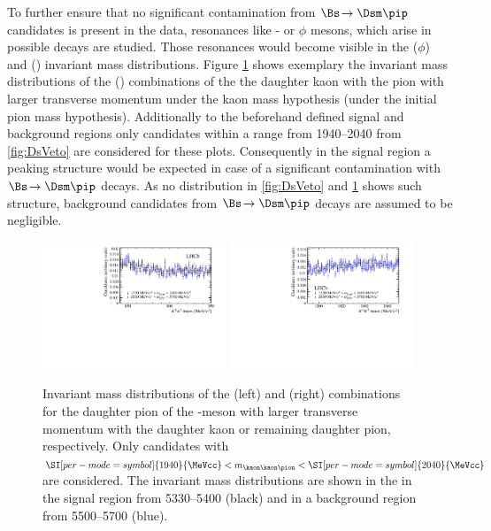 To further ensure that no significant contamination from $\Bs\!\to\Dsm\pip$ candidates is present in the data, resonances like \Kstarz- or $\phi$ mesons, which arise in possible \Dsm decays are studied.
Those resonances would become visible in the \kaon\kaon ($\phi$) and \kaon\pion (\Kstarz) invariant mass distributions.
Figure \ref{fig:phi_Kst_veto} shows exemplary the invariant mass distributions of the \kaon\kaon (\kaon\pion) combinations of the the daughter kaon with the
pion with larger transverse momentum under the kaon mass hypothesis (under the initial pion mass hypothesis).
Additionally to the beforehand defined signal and background regions only candidates within a range from \SIrange[per-mode=symbol]{1940}{2040}{\MeVcc} from \cref{fig:DsVeto} are considered for these plots.
Consequently in the signal region a peaking structure would be expected in case of a significant contamination with $\Bs\!\to\Dsm\pip$ decays.
As no distribution in \cref{fig:DsVeto} and \cref{fig:phi_Kst_veto} shows such structure, background candidates from $\Bs\!\to\Dsm\pip$ decays are assumed to be negligible.
\begin{figure}[tbp]
    \centering
    \includegraphics[width=0.49\textwidth]{06selection/figs/KstarHypo2.pdf}
    \includegraphics[width=0.49\textwidth]{06selection/figs/PhiHypo2.pdf}
    \caption{Invariant mass distributions of the \kaon\pion (left) and \kaon\kaon (right) combinations for the daughter pion of the \Dm-meson with larger transverse momentum with the daughter kaon or remaining daughter pion, respectively.
    Only candidates with $\SI[per-mode=symbol]{1940}{\MeVcc}<m_{\kaon\kaon\pion}<\SI[per-mode=symbol]{2040}{\MeVcc}$ are considered.
    The invariant mass distributions are shown in the in the \Bs signal region from \SIrange[per-mode=symbol]{5330}{5400}{\MeVcc} (black) and in a background region from \SIrange[per-mode=symbol]{5500}{5700}{\MeVcc} (blue).}
    \label{fig:phi_Kst_veto}
\end{figure}

